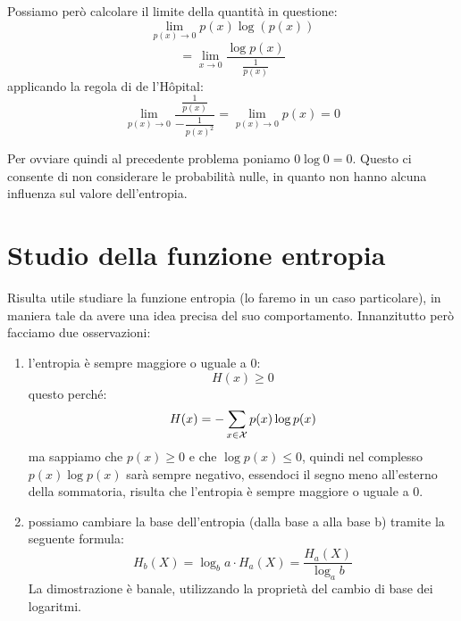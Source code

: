 \noindent
Possiamo però calcolare il limite della quantità in questione:
\[\lim_{p(x) \rightarrow 0} p(x) \log(p(x))\]
\[=\lim_{x \rightarrow 0} \frac{\log p(x)}{\frac{1}{p(x)}}\]
applicando la regola di de l'Hôpital:
\[\lim_{p(x) \rightarrow 0} \frac{\frac{1}{p(x)}}{-\frac{1}{p(x)^2}} = \lim_{p(x) \rightarrow 0} p(x) = 0\]

Per ovviare quindi al precedente problema poniamo \(0 \log 0 = 0\).
Questo ci consente di non considerare le probabilità nulle, in quanto non hanno alcuna influenza sul valore 
dell'entropia.







\section{Studio della funzione entropia}
Risulta utile studiare la funzione entropia (lo faremo in un caso particolare), in maniera tale da avere una idea precisa del suo comportamento.
Innanzitutto però facciamo due osservazioni:
\begin{enumerate}
\item l'entropia è sempre maggiore o uguale a 0:
\[H(x) \geq 0\]
questo perché:
\[H(x) = - \sum_{x \in \mathcal{X}} p(x) \log p(x)\]
ma sappiamo che \(p(x) \geq 0\) e che \(\log p(x) \leq 0\), quindi nel complesso \(p(x) \log p(x)\) sarà sempre negativo, essendoci il segno meno all'esterno della sommatoria, risulta che l'entropia è sempre maggiore o uguale a 0.

\item possiamo cambiare la base dell'entropia (dalla base a alla base b) tramite la seguente formula:
\[H_b(X) = \log_b a \cdot H_a(X) = \frac{H_a(X)}{\log_a b}\]
La dimostrazione è banale, utilizzando la proprietà del cambio di base dei logaritmi.
\end{enumerate}

